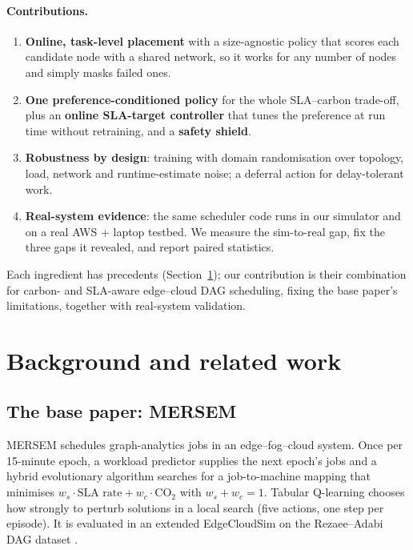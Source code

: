 \documentclass[11pt,a4paper]{article}
\begin{document}
\paragraph{Contributions.}
\begin{enumerate}
\item \textbf{Online, task-level placement} with a size-agnostic policy that scores each candidate node with a shared network, so it works for any number of nodes and simply masks failed ones.
\item \textbf{One preference-conditioned policy} for the whole SLA--carbon trade-off, plus an \textbf{online SLA-target controller} that tunes the preference at run time without retraining, and a \textbf{safety shield}.
\item \textbf{Robustness by design}: training with domain randomisation over topology, load, network and runtime-estimate noise; a deferral action for delay-tolerant work.
\item \textbf{Real-system evidence}: the same scheduler code runs in our simulator and on a real AWS + laptop testbed. We measure the sim-to-real gap, fix the three gaps it revealed, and report paired statistics.
\end{enumerate}

Each ingredient has precedents (Section~\ref{sec:related}); our contribution is their combination for carbon- and SLA-aware edge--cloud DAG scheduling, fixing the base paper's limitations, together with real-system validation.

\section{Background and related work}\label{sec:related}

\subsection{The base paper: MERSEM}\label{sec:base}
MERSEM \cite{mersem} schedules graph-analytics jobs in an edge--fog--cloud system. Once per 15-minute epoch, a workload predictor supplies the next epoch's jobs and a hybrid evolutionary algorithm searches for a job-to-machine mapping that minimises $w_s \cdot \text{SLA rate} + w_c \cdot \text{CO}_2$ with $w_s+w_c=1$. Tabular Q-learning chooses how strongly to perturb solutions in a local search (five actions, one step per episode). It is evaluated in an extended EdgeCloudSim \cite{edgecloudsim} on the Rezaee--Adabi DAG dataset \cite{dataset}.
\end{document}
